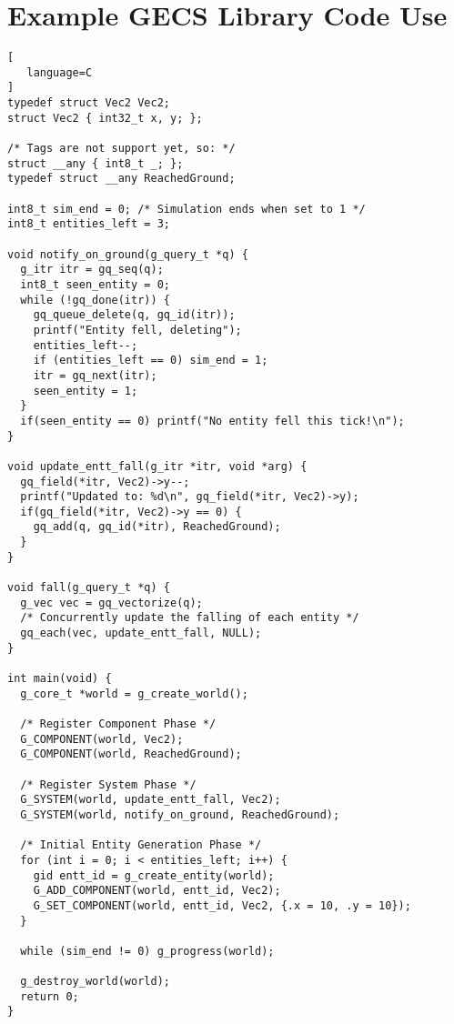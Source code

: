 \section{Example GECS Library Code Use}
\label{appendix:code_example_1}
\begin{lstlisting}[
   language=C
]
typedef struct Vec2 Vec2;
struct Vec2 { int32_t x, y; };

/* Tags are not support yet, so: */
struct __any { int8_t _; };
typedef struct __any ReachedGround;

int8_t sim_end = 0; /* Simulation ends when set to 1 */
int8_t entities_left = 3;

void notify_on_ground(g_query_t *q) {
  g_itr itr = gq_seq(q);
  int8_t seen_entity = 0;
  while (!gq_done(itr)) {
    gq_queue_delete(q, gq_id(itr));
    printf("Entity fell, deleting");
    entities_left--;
    if (entities_left == 0) sim_end = 1;
    itr = gq_next(itr);
    seen_entity = 1;
  }
  if(seen_entity == 0) printf("No entity fell this tick!\n");
}

void update_entt_fall(g_itr *itr, void *arg) { 
  gq_field(*itr, Vec2)->y--;
  printf("Updated to: %d\n", gq_field(*itr, Vec2)->y);
  if(gq_field(*itr, Vec2)->y == 0) {
    gq_add(q, gq_id(*itr), ReachedGround);
  } 
}

void fall(g_query_t *q) {
  g_vec vec = gq_vectorize(q);
  /* Concurrently update the falling of each entity */
  gq_each(vec, update_entt_fall, NULL);
}

int main(void) {
  g_core_t *world = g_create_world();

  /* Register Component Phase */
  G_COMPONENT(world, Vec2);
  G_COMPONENT(world, ReachedGround);

  /* Register System Phase */
  G_SYSTEM(world, update_entt_fall, Vec2);
  G_SYSTEM(world, notify_on_ground, ReachedGround);

  /* Initial Entity Generation Phase */
  for (int i = 0; i < entities_left; i++) {
    gid entt_id = g_create_entity(world);
    G_ADD_COMPONENT(world, entt_id, Vec2);
    G_SET_COMPONENT(world, entt_id, Vec2, {.x = 10, .y = 10});
  }

  while (sim_end != 0) g_progress(world);

  g_destroy_world(world);
  return 0;
}
\end{lstlisting}